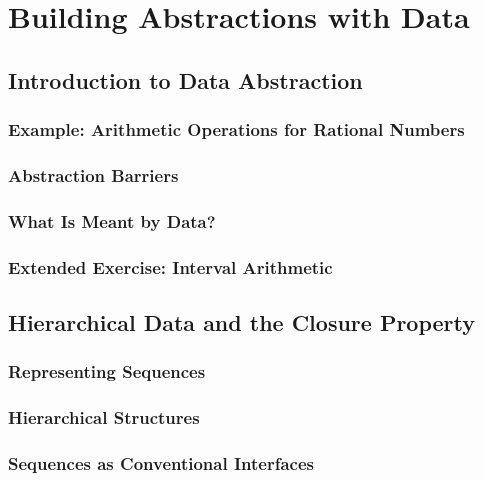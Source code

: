 %

    \section{Building Abstractions with Data}
        \subsection{Introduction to Data Abstraction}
            \subsubsection{Example: Arithmetic Operations for Rational Numbers}
            \subsubsection{Abstraction Barriers}
            \subsubsection{What Is Meant by Data?}
            \subsubsection{Extended Exercise: Interval Arithmetic}
        \subsection{Hierarchical Data and the Closure Property}
            \subsubsection{Representing Sequences}
            \subsubsection{Hierarchical Structures}
            \subsubsection{Sequences as Conventional Interfaces}

